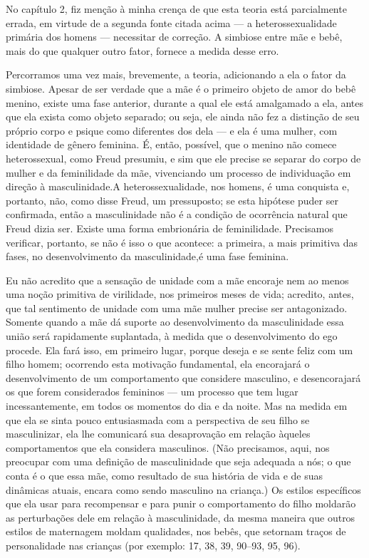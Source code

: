 No capítulo 2, fiz menção à minha crença de que esta teoria está
parcialmente errada, em virtude de a segunda fonte citada acima --- a
heterossexualidade primária dos homens --- necessitar de correção. A
simbiose entre mãe e bebê, mais do que qualquer outro fator, fornece a
medida desse erro.

Percorramos uma vez mais, brevemente, a teoria, adicionando a ela o
fator da simbiose. Apesar de ser verdade que a mãe é o primeiro objeto
de amor do bebê menino, existe uma fase anterior, durante a qual ele
está amalgamado a ela, antes que ela exista como objeto separado; ou
seja, ele ainda não fez a distinção de seu próprio corpo e psique como
diferentes dos dela --- e ela é uma mulher, com identidade de gênero
feminina. É, então, possível, que o menino não comece heterossexual,\label{cita1}
como Freud presumiu, e sim que ele precise se separar do corpo de
mulher e da feminilidade da mãe, vivenciando um processo de
individuação em direção à masculinidade.\idxmascupap[|(] A heterossexualidade, nos
homens, é uma conquista e, portanto, não, como disse Freud, um
pressuposto; se esta hipótese puder ser confirmada, então a
masculinidade não é a condição de ocorrência natural que Freud dizia
ser. Existe uma forma embrionária de feminilidade. Precisamos
verificar, portanto, se não é isso o que acontece: a primeira, a mais
primitiva das fases, no desenvolvimento da masculinidade,\idxheteroprim[|)] é uma fase
feminina.

Eu não acredito que a sensação de unidade com a mãe encoraje nem ao
menos uma noção primitiva de virilidade, nos primeiros meses de vida;
acredito, antes, que tal sentimento de unidade com uma mãe mulher
precise ser antagonizado. Somente quando a mãe dá suporte ao
desenvolvimento da masculinidade essa união será rapidamente
suplantada, à medida que o desenvolvimento do ego procede.
Ela fará isso, em primeiro lugar, porque deseja e se sente feliz com um
filho homem; ocorrendo esta motivação fundamental, ela encorajará o
desenvolvimento de um comportamento que considere masculino, e
desencorajará os que forem considerados femininos --- um processo que
tem lugar incessantemente, em todos os momentos do dia e da noite. Mas
na medida em que ela se sinta pouco entusiasmada com a perspectiva de
seu filho se masculinizar, ela lhe comunicará sua desaprovação em
relação àqueles comportamentos que ela considera masculinos. (Não
precisamos, aqui, nos preocupar com uma definição de masculinidade que
seja adequada a nós; o que conta é o que essa mãe, como resultado de
sua história de vida e de suas dinâmicas atuais, encara como sendo
masculino na criança.) Os estilos específicos que ela usar para
recompensar e para punir o comportamento do filho moldarão as
perturbações dele em relação à masculinidade, da mesma maneira que
outros estilos de maternagem moldam qualidades, nos bebês, que se\idxfreudmascu[|)]
tornam traços de personalidade nas crianças (por exemplo: 17, 38, 39,
90--93, 95, 96).

